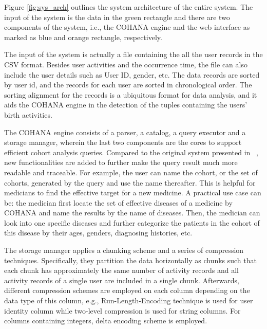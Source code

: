 \documentclass[10pt,conference,letterpaper]{IEEEtran}
\begin{document}
Figure \ref{fig:sys_arch} outlines the system architecture of the entire system. The input of the system is the data in the green rectangle and there are two components of the system, i.e., the COHANA engine and the web interface as marked as blue and orange rectangle, respectively. 

The input of the system is actually a file containing the all the user records in the CSV format. 
Besides user activities and the occurrence time, the file can also 
include the user details such as User ID, gender, etc. 
The data records are sorted by user id, and the records for each user are sorted in chronological order. 
The sorting alignment for the records is a ubiquitous format for data analysis, and it aids the COHANA engine in the detection of the tuples containing the users' birth activities.

The COHANA engine consists of a parser, a catalog, a query executor and a storage manager, wherein the last two components are the cores to support efficient cohort analysis queries. 
Compared to the original system presented in ~\cite{jiang2016cohort}, new functionalities are added to further make the query result much more readable and traceable.
For example, the user can name the cohort, or the set of cohorts, generated by the query and use the name thereafter.
This is helpful for medicians to find the effective target for a new medicine. 
A practical use case can be: the medician first locate the set of effective diseases of a medicine by COHANA and name the results by the name of diseases. Then, the medician can look into one specific diseases and further categorize the patients in the cohort of this disease by their ages, genders, diagnosing histories, etc.

The storage manager applies a chunking scheme and a series of compression techniques. Specifically, they partition the data horizontally as chunks such that each chunk has approximately the same number of activity records and all activity records of a single user are included in a single chunk. Afterwards, different compression schemes are employed on each column depending on the data type of this column, e.g., Run-Length-Encoding technique is used for user identity column while two-level compression is used for string columns. For columns containing integers, delta encoding scheme is employed. 
\end{document}
